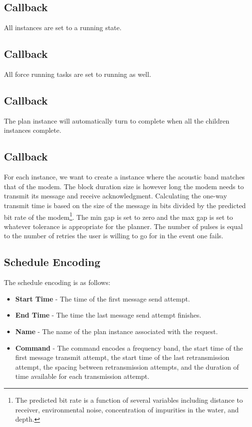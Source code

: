 \subsection{Callback }
All instances are set to a running state.

\subsection{Callback }
All force running tasks are set to running as well.

\subsection{Callback }
The plan instance will automatically turn to complete when all the  children instances complete.

\subsection{Callback }
For each  instance, we want to create a  instance where the acoustic band matches that of the modem. The block duration size is however long the modem needs to transmit its message and receive acknowledgment. Calculating the one-way transmit time is based on the size of the message in bits divided by the predicted bit rate of the modem\footnote{The predicted bit rate is a function of several variables including distance to receiver, environmental noise, concentration of impurities in the water, and depth.}. The min gap is set to zero and the max gap is set to whatever tolerance is appropriate for the  planner. The number of pulses is equal to the number of retries the user is willing to go for in the event one fails.

\subsection{Schedule Encoding}
The schedule encoding is as follows:
\begin{itemize}
\item \textbf{Start Time} - The time of the first message send attempt.
\item \textbf{End Time} - The time the last message send attempt finishes.
\item \textbf{Name} - The name of the plan instance associated with the  request.
\item \textbf{Command} - The command encodes a frequency band, the start time of the first message transmit attempt, the start time of the last retransmission attempt, the spacing between retransmission attempts, and the duration of time available for each transmission attempt.
\end{itemize}

